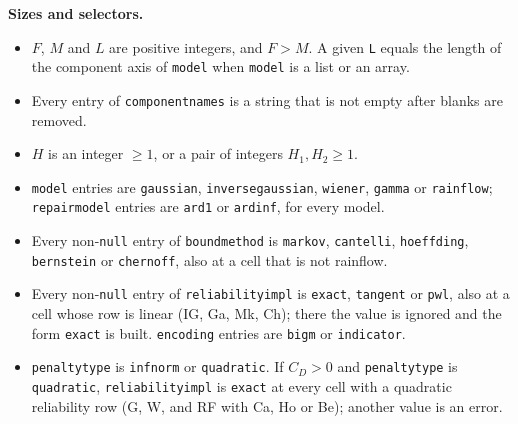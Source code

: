 \documentclass[11pt,a4paper]{article}
\theoremstyle{plain}
\theoremstyle{definition}
\renewcommand{\_}{\textunderscore\allowbreak{}}
\begin{document}
\textbf{Sizes and selectors.}
\begin{itemize}[leftmargin=1.5em]
  \item $F$, $M$ and $L$ are positive integers, and $F > M$. A given \texttt{L} equals the length of the component axis of \texttt{model} when \texttt{model} is a list or an array.
  \item Every entry of \texttt{component\_names} is a string that is not empty after blanks are removed.
  \item $H$ is an integer $\ge 1$, or a pair of integers $H_1, H_2 \ge 1$.
  \item \texttt{model} entries are \texttt{gaussian}, \texttt{inverse\_gaussian}, \texttt{wiener}, \texttt{gamma} or \texttt{rainflow}; \texttt{repair\_model} entries are \texttt{ard1} or \texttt{ardinf}, for every model.
  \item Every non-\texttt{null} entry of \texttt{bound\_method} is \texttt{markov}, \texttt{cantelli}, \texttt{hoeffding}, \texttt{bernstein} or \texttt{chernoff}, also at a cell that is not rainflow.
  \item Every non-\texttt{null} entry of \texttt{reliability\_impl} is \texttt{exact}, \texttt{tangent} or \texttt{pwl}, also at a cell whose row is linear (IG, Ga, Mk, Ch); there the value is ignored and the form \texttt{exact} is built. \texttt{encoding} entries are \texttt{bigm} or \texttt{indicator}.
  \item \texttt{penalty\_type} is \texttt{inf\_norm} or \texttt{quadratic}. If $C_D > 0$ and \texttt{penalty\_type} is \texttt{quadratic}, \texttt{reliability\_impl} is \texttt{exact} at every cell with a quadratic reliability row (G, W, and RF with Ca, Ho or Be); another value is an error.
\end{itemize}
\end{document}
